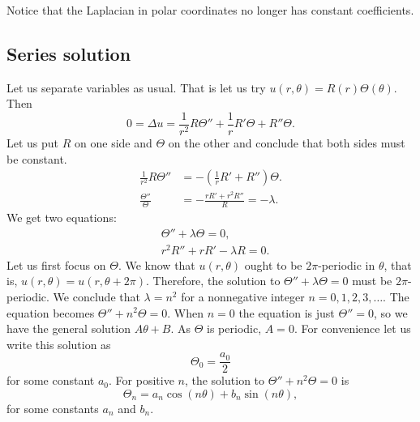Notice that the Laplacian in polar coordinates no longer has constant
coefficients.

\subsection{Series solution}

Let us separate variables as usual.  That is let us try
$u(r,\theta) = R(r)\Theta(\theta)$.  Then
\begin{equation*}
0 = \Delta u = 
\frac{1}{r^2} R \Theta''
+
\frac{1}{r} R' \Theta
+
R'' \Theta .
\end{equation*}
Let us put $R$ on one side and $\Theta$ on the other and conclude
that both sides must be constant.
\begin{align*}
\frac{1}{r^2} R \Theta''
& =
-
\left(\frac{1}{r} R' + R''\right) \Theta .
\\
\frac{\Theta''}{\Theta}
& =
-
\frac{r R' + r^2 R''}{R} = -\lambda.
\end{align*}
We get two equations:
\begin{align*}
& \Theta'' + \lambda \Theta = 0 ,
\\
& r^2 R'' + r R' -\lambda R = 0.
\end{align*}
Let us first focus on $\Theta$.  We know that $u(r,\theta)$ ought to be
$2\pi$-periodic in $\theta$, that is,
$u(r,\theta) = u(r,\theta+2\pi)$.  Therefore, the solution to
$\Theta'' + \lambda \Theta = 0$ must be $2\pi$-periodic.  We conclude
that
$\lambda = n^2$ for a
nonnegative integer $n=0,1,2,3,\ldots$.  The equation becomes
$\Theta'' + n^2 \Theta = 0$.  When $n=0$ the equation is just
$\Theta'' = 0$, so we have the general solution $A \theta + B$.  As
$\Theta$ is periodic,
$A=0$.
For convenience let us write this solution as
\begin{equation*}
\Theta_0 = \frac{a_0}{2}
\end{equation*}
for some constant $a_0$.  For positive $n$,
the 
solution to
$\Theta'' + n^2 \Theta = 0$ is
\begin{equation*}
\Theta_n = a_n \cos(n\theta) + b_n \sin(n\theta) ,
\end{equation*}
for some constants $a_n$ and $b_n$.

